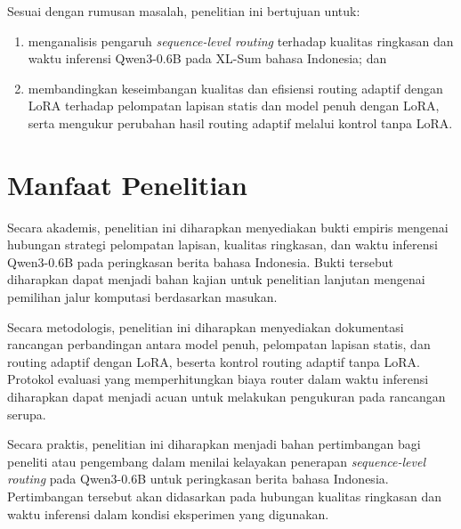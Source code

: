 Sesuai dengan rumusan masalah, penelitian ini bertujuan untuk:

\begin{enumerate}
  \item menganalisis pengaruh \textit{sequence-level routing} terhadap kualitas ringkasan dan waktu inferensi Qwen3-0.6B pada XL-Sum bahasa Indonesia; dan
  \item membandingkan keseimbangan kualitas dan efisiensi routing adaptif dengan LoRA terhadap pelompatan lapisan statis dan model penuh dengan LoRA, serta mengukur perubahan hasil routing adaptif melalui kontrol tanpa LoRA.
\end{enumerate}

\section{Manfaat Penelitian}

Secara akademis, penelitian ini diharapkan menyediakan bukti empiris mengenai hubungan strategi pelompatan lapisan, kualitas ringkasan, dan waktu inferensi Qwen3-0.6B pada peringkasan berita bahasa Indonesia. Bukti tersebut diharapkan dapat menjadi bahan kajian untuk penelitian lanjutan mengenai pemilihan jalur komputasi berdasarkan masukan.

Secara metodologis, penelitian ini diharapkan menyediakan dokumentasi rancangan perbandingan antara model penuh, pelompatan lapisan statis, dan routing adaptif dengan LoRA, beserta kontrol routing adaptif tanpa LoRA. Protokol evaluasi yang memperhitungkan biaya router dalam waktu inferensi diharapkan dapat menjadi acuan untuk melakukan pengukuran pada rancangan serupa.

Secara praktis, penelitian ini diharapkan menjadi bahan pertimbangan bagi peneliti atau pengembang dalam menilai kelayakan penerapan \textit{sequence-level routing} pada Qwen3-0.6B untuk peringkasan berita bahasa Indonesia. Pertimbangan tersebut akan didasarkan pada hubungan kualitas ringkasan dan waktu inferensi dalam kondisi eksperimen yang digunakan.
